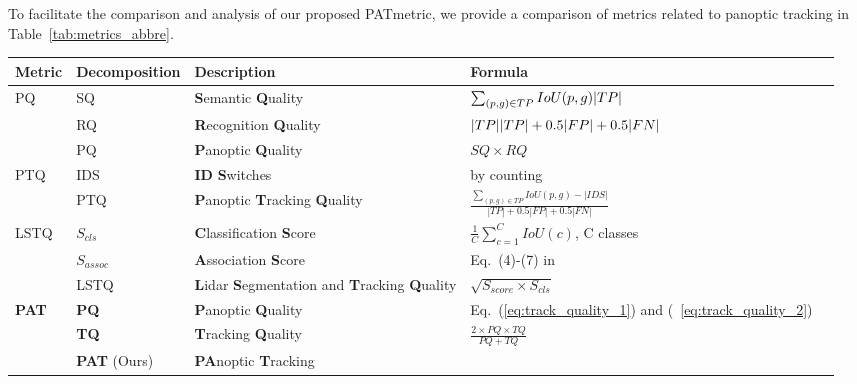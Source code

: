 \documentclass[letterpaper, 10 pt, journal, twoside]{IEEEtran}
\newcommand{\tableref}[1]{Table~\ref{#1}}
\newcommand{\newmet}{PAT}
\begin{document}
To facilitate the comparison and analysis of our proposed \newmet metric, we provide a comparison of metrics related to panoptic tracking in \tableref{tab:metrics_abbre}.

\begin{table*}
\centering
\caption{Panoptic segmentation and tracking metrics, PQ is the panoptic segmentation metric, PTQ, LSTQ, and PAT are the panoptic tracking metrics.}
\label{tab:metrics_abbre}
\footnotesize
\begin{tabular}
{lllll}
\toprule
Metric & Decomposition & Description & Formula \\
\toprule
\multirow{2}{*}{PQ~\cite{kirillov2019panoptic}} & SQ & \textbf{S}emantic \textbf{Q}uality & $\sum_{(p,g)\in {TP}} IoU(p, g) \/ {|TP|}$ \\ & RQ & \textbf{R}ecognition \textbf{Q}uality & $|TP| \/ {|TP| + 0.5 |FP| + 0.5 |FN|}$ \\ & PQ & \textbf{P}anoptic \textbf{Q}uality  & $SQ \times RQ$ \\
\midrule
\multirow{2}{*}{PTQ~\cite{hurtado2020mopt}}
& IDS & \textbf{ID} \textbf{S}witches  & by counting \\
& PTQ & \textbf{P}anoptic \textbf{T}racking \textbf{Q}uality & $\frac{{\sum_{(p,g)\in {TP}} IoU(p, g)} - |IDS|}{|TP| + 0.5 |FP| + 0.5 |FN|}$ \\
\midrule
\multirow{3}{*}{LSTQ~\cite{aygun20214d}}
& $S_{cls}$ & \textbf{C}lassification \textbf{S}core  &  $\frac{1}{C}\sum_{c=1}^{C} IoU(c)$, C classes \\
& $S_{assoc}$ & \textbf{A}ssociation \textbf{S}core & Eq.~(4)-(7) in \cite{aygun20214d}    \\
& LSTQ & \textbf{L}idar \textbf{S}egmentation and \textbf{T}racking \textbf{Q}uality & $\sqrt{S_{score} \times S_{cls}}$    \\
\midrule
\multirow{3}{*}{\textbf{PAT}} & \textbf{PQ} & \textbf{P}anoptic \textbf{Q}uality & Eq.~(\ref{eq:track_quality_1}) and (~\ref{eq:track_quality_2})\\
& \textbf{TQ} & \textbf{T}racking \textbf{Q}uality & $\frac{2 \times PQ \times TQ}{PQ + TQ}$ \\
& \textbf{PAT} (Ours) & \textbf{PA}noptic \textbf{T}racking &  \\
\bottomrule
\end{tabular}
\end{table*}
\end{document}

